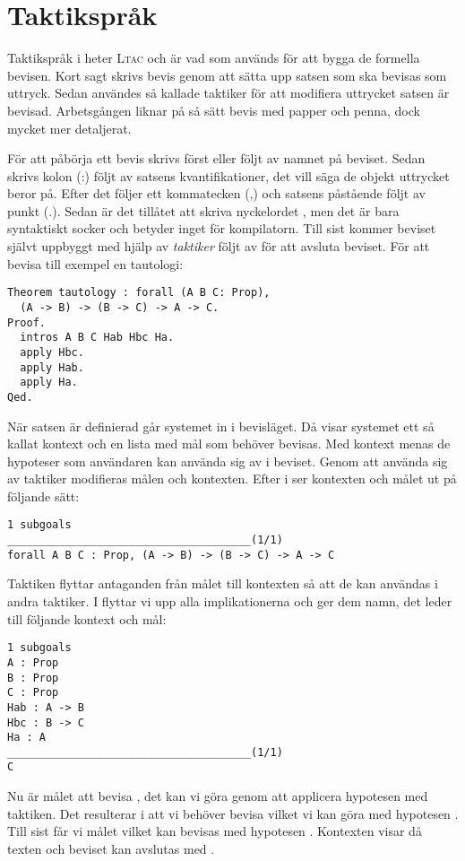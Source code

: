 \section{Taktikspråk}
Taktikspråk i \coq{} heter \textsc{Ltac} och är vad som används för att bygga
de formella bevisen. Kort sagt skrivs bevis genom att sätta upp satsen som ska
bevisas som uttryck. Sedan användes så kallade taktiker för att modifiera
uttrycket satsen är bevisad. Arbetsgången liknar på så sätt bevis med papper
och penna, dock mycket mer detaljerat.

För att påbörja ett bevis skrivs först  eller  följt av
namnet på beviset. Sedan skrivs kolon (:) följt av satsens kvantifikationer,
det vill säga de objekt uttrycket beror på. Efter det följer ett kommatecken
(,) och satsens påstående följt av punkt (.). Sedan är det tillåtet att skriva
nyckelordet , men det är bara syntaktiskt socker och betyder inget för
kompilatorn. Till sist kommer beviset självt uppbyggt med hjälp av
\emph{taktiker} följt av  för att avsluta beviset. För att bevisa till
exempel en tautologi:

\begin{lstlisting}
Theorem tautology : forall (A B C: Prop),
  (A -> B) -> (B -> C) -> A -> C.
Proof.
  intros A B C Hab Hbc Ha.
  apply Hbc.
  apply Hab.
  apply Ha.
Qed.
\end{lstlisting}

När satsen är definierad går systemet in i bevisläget. Då visar systemet ett så
kallat kontext och en lista med mål som behöver bevisas. Med kontext menas de
hypoteser som användaren kan använda sig av i beviset. Genom att använda sig av
taktiker modifieras målen och kontexten. Efter  i  ser
kontexten och målet ut på följande sätt:
\begin{lstlisting}
1 subgoals
______________________________________(1/1)
forall A B C : Prop, (A -> B) -> (B -> C) -> A -> C
\end{lstlisting}

Taktiken  flyttar antaganden från målet till kontexten så att de kan
användas i andra taktiker. I  flyttar vi upp alla implikationerna
och ger dem namn, det leder till följande kontext och mål:
\begin{lstlisting}
1 subgoals
A : Prop
B : Prop
C : Prop
Hab : A -> B
Hbc : B -> C
Ha : A
______________________________________(1/1)
C
\end{lstlisting}

Nu är målet att bevisa , det kan vi göra genom att applicera hypotesen
 med  taktiken. Det resulterar i att vi behöver bevisa 
vilket vi kan göra med hypotesen . Till sist får vi målet  vilket
kan bevisas med hypotesen . Kontexten visar då texten  och beviset kan avslutas med .
